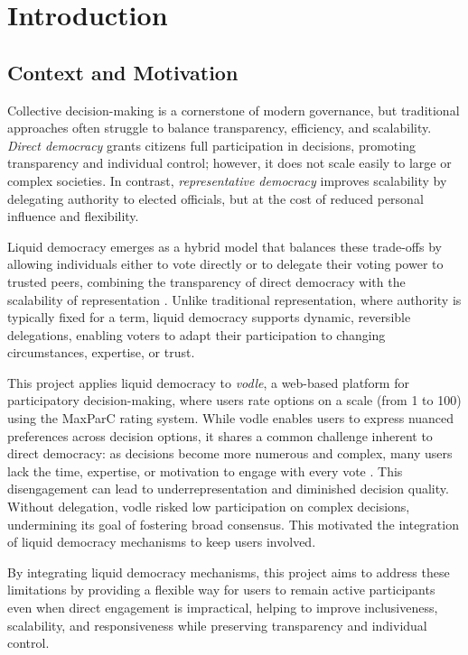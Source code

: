 \chapter{Introduction}\label{ch:introduction}

\section{Context and Motivation}

Collective decision-making is a cornerstone of modern governance, but traditional approaches often struggle to balance transparency, efficiency, and scalability. \textit{Direct democracy} grants citizens full participation in decisions, promoting transparency and individual control; however, it does not scale easily to large or complex societies. In contrast, \textit{representative democracy} improves scalability by delegating authority to elected officials, but at the cost of reduced personal influence and flexibility.

Liquid democracy emerges as a hybrid model that balances these trade-offs by allowing individuals either to vote directly or to delegate their voting power to trusted peers, combining the transparency of direct democracy with the scalability of representation \citep{ford_delegative_2002, blum_liquid_2016}. Unlike traditional representation, where authority is typically fixed for a term, liquid democracy supports dynamic, reversible delegations, enabling voters to adapt their participation to changing circumstances, expertise, or trust.

This project applies liquid democracy to \textit{vodle}, a web-based platform for participatory decision-making, where users rate options on a scale (from 1 to 100) using the MaxParC rating system. While vodle enables users to express nuanced preferences across decision options, it shares a common challenge inherent to direct democracy: as decisions become more numerous and complex, many users lack the time, expertise, or motivation to engage with every vote \citep{ford_delegative_2002, blum_liquid_2016}. This disengagement can lead to underrepresentation and diminished decision quality. Without delegation, vodle risked low participation on complex decisions, undermining its goal of fostering broad consensus. This motivated the integration of liquid democracy mechanisms to keep users involved.

By integrating liquid democracy mechanisms, this project aims to address these limitations by providing a flexible way for users to remain active participants even when direct engagement is impractical, helping to improve inclusiveness, scalability, and responsiveness while preserving transparency and individual control.

